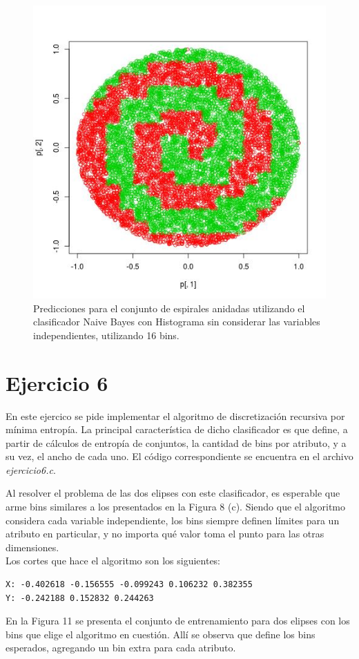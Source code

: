 \documentclass[12pt, a4paper]{article}
\begin{document}
\begin{figure}
    \centering
	\includegraphics[scale=0.45]{espiralesInd}
	\caption{Predicciones para el conjunto de espirales anidadas utilizando el clasificador Naive Bayes con Histograma sin considerar las variables independientes, utilizando 16 bins.}
\end{figure}


\section*{Ejercicio 6}
En este ejercico se pide implementar el algoritmo de discretización recursiva por mínima entropía. La principal característica de dicho clasificador es que define, a partir de cálculos de entropía de conjuntos, la cantidad de bins por atributo, y a su vez, el ancho de cada uno. El código correspondiente se encuentra en el archivo \textit{ejercicio6.c}.

\bigskip

Al resolver el problema de las dos elipses con este clasificador, es esperable que arme bins similares a los presentados en la Figura 8 (c). Siendo que el algoritmo considera cada variable independiente, los bins siempre definen límites para un atributo en particular, y no importa qué valor toma el punto para las otras dimensiones.\\
Los cortes que hace el algoritmo son los siguientes:
\begin{verbatim}
X: -0.402618 -0.156555 -0.099243 0.106232 0.382355 
Y: -0.242188 0.152832 0.244263 
\end{verbatim}
En la Figura 11 se presenta el conjunto de entrenamiento para dos elipses con los bins que elige el algoritmo en cuestión. Allí se observa que define los bins esperados, agregando un bin extra para cada atributo. 
\end{document}
